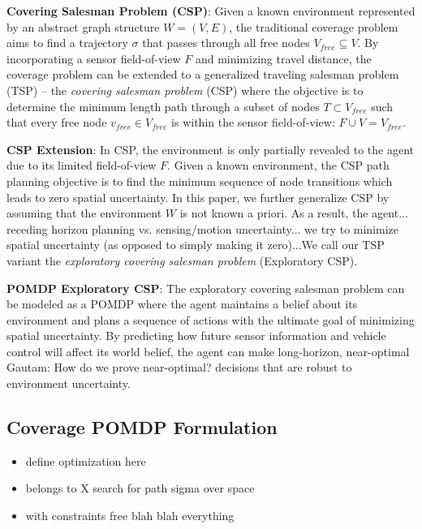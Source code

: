 \documentclass{article}
\newcommand{\ph}[1]{{\textbf{#1}:}} %
\newcommand{\gautam}[1]{{\color{cyan}Gautam: #1 }}
\begin{document}






\ph{Covering Salesman Problem (CSP)} Given a known environment represented by an abstract graph structure $W = (V, E)$, the traditional coverage problem aims to find a trajectory $\sigma$ that passes through all free nodes $V_{free} \subseteq V$. By  incorporating a sensor field-of-view $F$ and minimizing travel distance, the coverage problem can be extended to a generalized traveling salesman problem (TSP) -- the \emph{covering salesman problem} (CSP) where the objective is to determine the minimum length path through a subset of nodes $T \subset V_{free}$ such that every free node $v_{free} \in V_{free}$ is within the sensor field-of-view: $F \cup V = V_{free}$.

\ph{CSP Extension} In CSP, the environment is only partially revealed to the agent due to its limited field-of-view $F$. Given a known environment, the CSP path planning objective is to find the minimum sequence of node transitions which leads to zero spatial uncertainty. In this paper, we further generalize CSP by assuming that the environment $W$ is not known a priori. As a result, the agent... receding horizon planning vs. sensing/motion uncertainty... we try to minimize spatial uncertainty (as opposed to simply making it zero)...We call our TSP variant the \emph{exploratory covering salesman problem} (Exploratory CSP). 

\ph{POMDP Exploratory CSP}
The exploratory covering salesman problem can be modeled as a POMDP where the agent maintains a belief about its environment and plans a sequence of actions with the ultimate goal of minimizing spatial uncertainty. By predicting how future sensor information and vehicle control will affect its world belief, the agent can make long-horizon, near-optimal \gautam{How do we prove near-optimal?} decisions that are robust to environment uncertainty. 

\subsection{Coverage POMDP Formulation}
\begin{itemize}
    \item define optimization here
    \item belongs to X search for path sigma over space
    \item with constraints free blah blah everything
\end{itemize}
\end{document}

